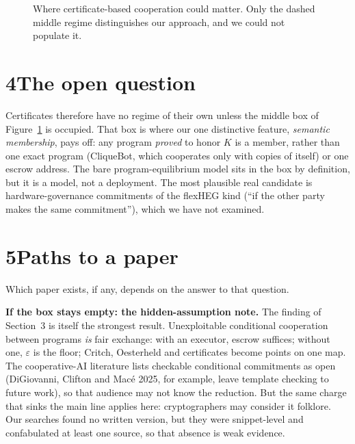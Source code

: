 \documentclass[11pt]{article}
\begin{document}
\begin{figure}[h]
\centering
{}
\caption{Where certificate-based cooperation could matter. Only the dashed middle regime distinguishes our approach, and we could not populate it.}
\label{fig:executor}
\end{figure}

\section*{4\quad The open question}

Certificates therefore have no regime of their own unless the middle box of Figure~\ref{fig:executor} is occupied. That box is where our one distinctive feature, \emph{semantic membership}, pays off: any program \emph{proved} to honor $K$ is a member, rather than one exact program (CliqueBot, which cooperates only with copies of itself) or one escrow address. The bare program-equilibrium model sits in the box by definition, but it is a model, not a deployment. The most plausible real candidate is hardware-governance commitments of the flexHEG kind (``if the other party makes the same commitment''), which we have not examined.

\section*{5\quad Paths to a paper}

Which paper exists, if any, depends on the answer to that question.

\textbf{If the box stays empty: the hidden-assumption note.} The finding of Section~3 is itself the strongest result. Unexploitable conditional cooperation between programs \emph{is} fair exchange: with an executor, escrow suffices; without one, $\varepsilon$ is the floor; Critch, Oesterheld and certificates become points on one map. The cooperative-AI literature lists checkable conditional commitments as open (DiGiovanni, Clifton and Macé 2025, for example, leave template checking to future work), so that audience may not know the reduction. But the same charge that sinks the main line applies here: cryptographers may consider it folklore. Our searches found no written version, but they were snippet-level and confabulated at least one source, so that absence is weak evidence.
\end{document}
